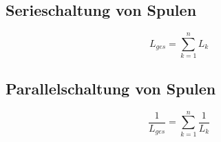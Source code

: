 



\subsection{Serieschaltung von Spulen}
\[ L_{ges} = \sum_{k=1}^{n} L_k \]

\subsection{Parallelschaltung von Spulen}
\[ \frac{1}{L_{ges}} = \sum_{k=1}^{n} \frac{1}{L_k} \]
